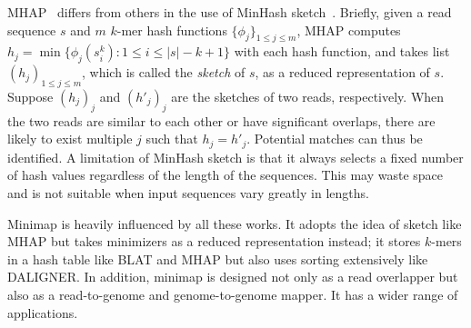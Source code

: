 \documentclass{bioinfo}
\begin{document}
\begin{methods}
MHAP~\citep{Berlin:2015xy} differs from others in the use of MinHash
sketch~\citep{Broder:1997aa}.  Briefly, given a read sequence $s$ and $m$
$k$-mer hash functions $\{\phi_j\}_{1\le j\le m}$, MHAP computes
$h_j=\min\{\phi_j(s_i^k):1\le i\le |s|-k+1\}$ with each hash function, and
takes list $(h_j)_{1\le j\le m}$, which is called the \emph{sketch} of
$s$, as a reduced representation of $s$. Suppose $(h_j)_j$ and $(h'_j)_j$ are
the sketches of two reads, respectively. When the two reads are similar to each
other or have significant overlaps, there are likely to exist multiple $j$ such
that $h_j=h'_j$. Potential matches can thus be identified. A limitation of
MinHash sketch is that it always selects a fixed number of hash values
regardless of the length of the sequences. This may waste space and is not
suitable when input sequences vary greatly in lengths.

Minimap is heavily influenced by all these works. It adopts the idea of sketch
like MHAP but takes minimizers \citep{Roberts:2004fv} as a reduced
representation instead; it stores $k$-mers in a hash table like BLAT and MHAP
but also uses sorting extensively like DALIGNER. In addition, minimap is
designed not only as a read overlapper but also as a read-to-genome and
genome-to-genome mapper. It has a wider range of applications.

%



\end{methods}
\end{document}
